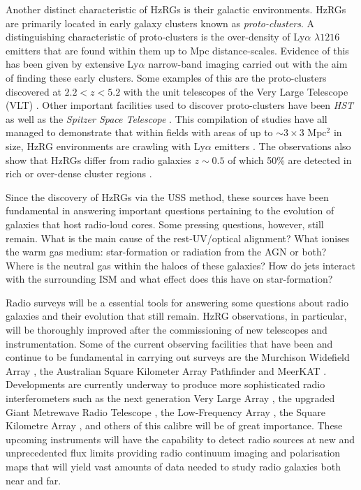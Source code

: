 Another distinct characteristic of HzRGs is their galactic environments. HzRGs are primarily located in early galaxy clusters known as {\it proto-clusters}. A distinguishing characteristic of proto-clusters is the over-density of Ly$\alpha$ $\lambda1216$ emitters that are found within them up to Mpc distance-scales. Evidence of this has been given by extensive Ly$\alpha$ narrow-band imaging carried out with the aim of finding these early clusters. Some examples of this are the proto-clusters discovered at $2.2 < z < 5.2$ with the unit telescopes of the Very Large Telescope (VLT) \citep{Kurk2000,Venemans2002,Venemans2004,Croft2005}. Other important facilities used to discover proto-clusters have been {\it HST} as well as the {\it Spitzer Space Telescope} \citep{Miley2004,Overzier2005,Kodama2007,Galametz2010,Galametz2012}. This compilation of studies have all managed to demonstrate that within fields with areas of up to $\sim3 \times 3$ Mpc$^2$ in size, HzRG environments are crawling with Ly$\alpha$ emitters \citep{Venemans2007}. The observations also show that HzRGs differ from radio galaxies $z\sim0.5$ of which 50\% are detected in rich or over-dense cluster regions \citep{HillLilly1991}. 

Since the discovery of HzRGs via the USS method, these sources have been fundamental in answering important questions pertaining to the evolution of galaxies that host radio-loud cores. Some pressing questions, however, still remain. What is the main cause of the rest-UV/optical alignment? What ionises the warm gas medium: star-formation or radiation from the AGN or both? Where is the neutral  gas within the haloes of these galaxies? How do jets interact with the surrounding ISM and what effect does this have on star-formation? 

Radio surveys will be a essential tools for answering some questions about radio galaxies and their evolution that still remain. HzRG observations, in particular, will be thoroughly improved after the commissioning of new telescopes and instrumentation. Some of the current observing facilities that have been and continue to be fundamental in carrying out surveys are the Murchison Widefield Array \citep[MWA;][]{Lonsdale2009,Bowman2013}, the Australian Square Kilometer Array Pathfinder \citep[ASKAP;][]{Johnston2009} and MeerKAT \citep{Davidson2012}. Developments are currently underway to produce more sophisticated radio interferometers such as the next generation Very Large Array \citep[ngVLA][]{McKinnon2019}, the upgraded Giant Metrewave Radio Telescope \citep[uGMRT;][]{Gupta2017}, the Low-Frequency Array \citep[LOFAR;][]{vanHaarlem2013}, the Square Kilometre Array \citep[SKA;][]{CarilliRawlings2004,Braun2015}, and others of this calibre will be of great importance. These upcoming instruments will have the capability to detect radio sources at new and unprecedented flux limits providing radio continuum imaging and polarisation maps that will yield vast amounts of data needed to study radio galaxies both near and far.

